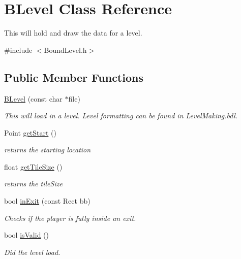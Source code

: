 \hypertarget{class_b_level}{\section{\-B\-Level \-Class \-Reference}
\label{class_b_level}
}


\-This will hold and draw the data for a level.  




{\ttfamily \#include $<$\-Bound\-Level.\-h$>$}

\subsection*{\-Public \-Member \-Functions}
\begin{DoxyCompactItemize}
\item 
\hyperlink{class_b_level_a8e48d62f02a21d2a57c682dc7737396f}{\-B\-Level} (const char $\ast$file)
\begin{DoxyCompactList}\small\item\em \-This will load in a level. \-Level formatting can be found in \-Level\-Making.\-bdl. \end{DoxyCompactList}\item 
\-Point \hyperlink{class_b_level_ad4f4a9f5658ac8ed21917df61678f4b2}{get\-Start} ()
\begin{DoxyCompactList}\small\item\em returns the starting location \end{DoxyCompactList}\item 
float \hyperlink{class_b_level_a8d02e52b25ff8c39bb68d0880c31771c}{get\-Tile\-Size} ()
\begin{DoxyCompactList}\small\item\em returns the tile\-Size \end{DoxyCompactList}\item 
bool \hyperlink{class_b_level_af5e69744df511186e383aa68936869dd}{in\-Exit} (const \-Rect bb)
\begin{DoxyCompactList}\small\item\em \-Checks if the player is fully inside an exit. \end{DoxyCompactList}\item 
bool \hyperlink{class_b_level_ad9a6d59f73f29c78a0b2e57997202eb5}{is\-Valid} ()
\begin{DoxyCompactList}\small\item\em \-Did the level load. \end{DoxyCompactList}\item 

\end{DoxyCompactItemize}
